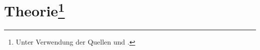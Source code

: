 \section[Theorie]{Theorie\footnote{Unter Verwendung der Quellen \cite[]{man:v308} und \cite[]{demtroeder2}.}}









